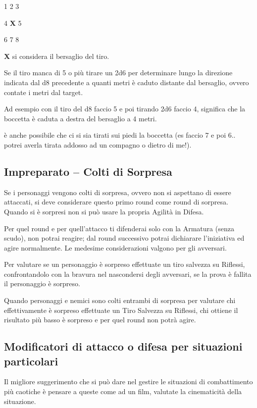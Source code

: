 \documentclass[a4paper,11pt,twoside,openany]{book}
\begin{document}
1 2 3

4 \textbf{X} 5

6 7 8

\textbf{X} si considera il bersaglio del tiro.

Se il tiro manca di 5 o più tirare un 2d6 per determinare lungo la direzione indicata dal d8 precedente a quanti metri è caduto distante dal bersaglio, ovvero contate i metri dal target.

Ad esempio con il tiro del d8 faccio 5 e poi tirando 2d6 faccio 4, significa che la boccetta è caduta a destra del bersaglio a 4 metri.

è anche possibile che ci si sia tirati sui piedi la boccetta (es faccio 7 e poi 6.. potrei averla tirata addosso ad un compagno o dietro di me!).

\subsection{Impreparato -- Colti di Sorpresa}

Se i personaggi vengono colti di sorpresa, ovvero non si aspettano di essere attaccati, si deve considerare questo primo round come round di sorpresa. Quando si è sorpresi non si può usare la propria Agilità in Difesa.

Per quel round e per quell'attacco ti difenderai solo con la Armatura (senza scudo), non potrai reagire; dal round successivo potrai dichiarare l'iniziativa ed agire normalmente. Le medesime considerazioni valgono per gli avversari.

Per valutare se un personaggio è sorpreso effettuate un tiro salvezza su Riflessi, confrontandolo con la bravura nel nascondersi degli avversari, se la prova è fallita il personaggio è sorpreso. 

Quando personaggi e nemici sono colti entrambi di sorpresa per valutare chi effettivamente è sorpreso effettuate un Tiro Salvezza su Riflessi, chi ottiene il risultato più basso è sorpreso e per quel round non potrà agire.

\subsection{Modificatori di attacco o difesa per situazioni particolari} 

Il migliore suggerimento che si può dare nel gestire le situazioni di combattimento più caotiche è pensare a queste come ad un film, valutate la cinematicità della situazione.
\end{document}
